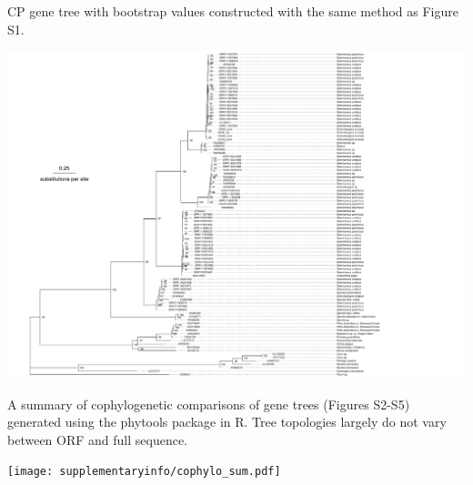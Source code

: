 \documentclass[11pt]{article}
\begin{document}
\begin{suppfigure}
\centering
\caption{
CP gene tree with bootstrap values constructed with the same method as Figure S1.
}
\includegraphics[width=1.3\textwidth]{supplementaryinfo/cp_tr.pdf}
\label{fig:genetree5}
\end{suppfigure}
\clearpage

\begin{suppfigure}
\centering
\caption{
A summary of cophylogenetic comparisons of gene trees (Figures S2-S5) generated using the phytools package in R. Tree topologies largely do not vary between ORF and full sequence.
}
\texttt{[image: supplementaryinfo/cophylo\_sum.pdf]}
\label{fig:cophylosum}
\end{suppfigure}
\clearpage

%
%
\end{document}
